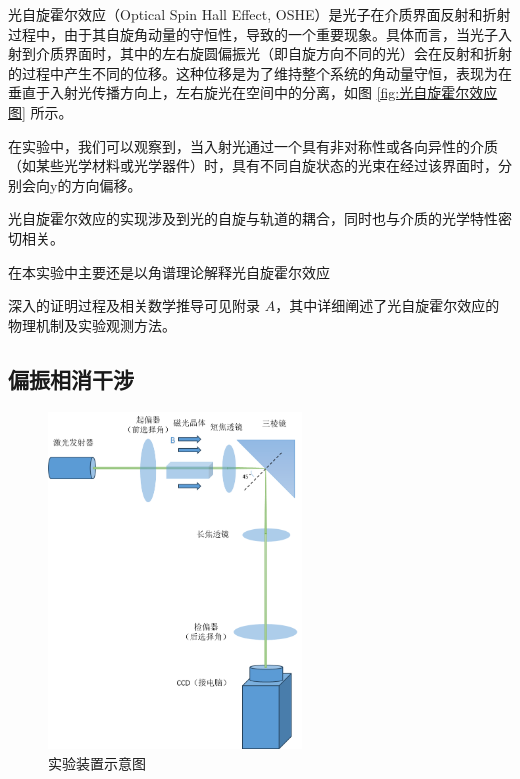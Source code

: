 \documentclass[12pt]{ctexart}
\numberwithin{equation}{section} %
\begin{document}
光自旋霍尔效应（Optical Spin Hall Effect, OSHE）是光子在介质界面反射和折射过程中，由于其自旋角动量的守恒性，导致的一个重要现象。具体而言，当光子入射到介质界面时，其中的左右旋圆偏振光（即自旋方向不同的光）会在反射和折射的过程中产生不同的位移。这种位移是为了维持整个系统的角动量守恒，表现为在垂直于入射光传播方向上，左右旋光在空间中的分离，如图 \ref{fig:光自旋霍尔效应图} 所示。

在实验中，我们可以观察到，当入射光通过一个具有非对称性或各向异性的介质（如某些光学材料或光学器件）时，具有不同自旋状态的光束在经过该界面时，分别会向y的方向偏移。


光自旋霍尔效应的实现涉及到光的自旋与轨道的耦合，同时也与介质的光学特性密切相关。

在本实验中主要还是以角谱理论解释光自旋霍尔效应

深入的证明过程及相关数学推导可见附录 $A$，其中详细阐述了光自旋霍尔效应的物理机制及实验观测方法。


\subsection{偏振相消干涉}
\begin{figure}[H] %
    \centering %
    \includegraphics[width=0.6\textwidth]{实验装置图.png} %
    \caption{实验装置示意图} %
    \label{fig:实验装置抽象图} %
\end{figure}
\end{document}
